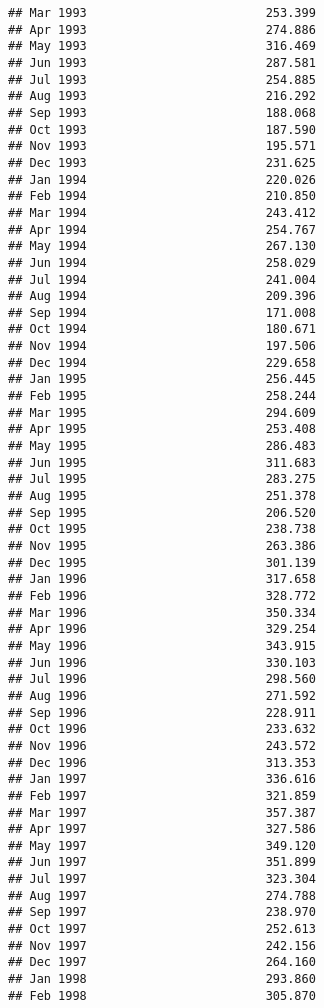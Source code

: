 \documentclass[
]{article}
\begin{document}
\begin{verbatim}
## Mar 1993                         253.399
## Apr 1993                         274.886
## May 1993                         316.469
## Jun 1993                         287.581
## Jul 1993                         254.885
## Aug 1993                         216.292
## Sep 1993                         188.068
## Oct 1993                         187.590
## Nov 1993                         195.571
## Dec 1993                         231.625
## Jan 1994                         220.026
## Feb 1994                         210.850
## Mar 1994                         243.412
## Apr 1994                         254.767
## May 1994                         267.130
## Jun 1994                         258.029
## Jul 1994                         241.004
## Aug 1994                         209.396
## Sep 1994                         171.008
## Oct 1994                         180.671
## Nov 1994                         197.506
## Dec 1994                         229.658
## Jan 1995                         256.445
## Feb 1995                         258.244
## Mar 1995                         294.609
## Apr 1995                         253.408
## May 1995                         286.483
## Jun 1995                         311.683
## Jul 1995                         283.275
## Aug 1995                         251.378
## Sep 1995                         206.520
## Oct 1995                         238.738
## Nov 1995                         263.386
## Dec 1995                         301.139
## Jan 1996                         317.658
## Feb 1996                         328.772
## Mar 1996                         350.334
## Apr 1996                         329.254
## May 1996                         343.915
## Jun 1996                         330.103
## Jul 1996                         298.560
## Aug 1996                         271.592
## Sep 1996                         228.911
## Oct 1996                         233.632
## Nov 1996                         243.572
## Dec 1996                         313.353
## Jan 1997                         336.616
## Feb 1997                         321.859
## Mar 1997                         357.387
## Apr 1997                         327.586
## May 1997                         349.120
## Jun 1997                         351.899
## Jul 1997                         323.304
## Aug 1997                         274.788
## Sep 1997                         238.970
## Oct 1997                         252.613
## Nov 1997                         242.156
## Dec 1997                         264.160
## Jan 1998                         293.860
## Feb 1998                         305.870

\end{verbatim}
\end{document}
